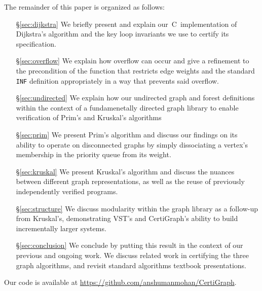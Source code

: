 The remainder of this paper is organized as follows:
\begin{itemize}
    \item[\S\ref{sec:dijkstra}] We briefly present and explain
    our~C~implementation of Dijkstra's algorithm and the key loop invariants
    we use to certify its specification.
    \item[\S\ref{sec:overflow}] We explain how overflow can occur and give a
    refinement to the precondition of the function that restricts edge weights
    and the standard \texttt{INF} definition
    appropriately in a way that prevents said overflow.
    \item[\S\ref{sec:undirected}] We explain how our undirected graph and forest definitions within the context of a fundamenetally directed graph library to enable verification of Prim's and Kruskal's algorithms
    \item[\S\ref{sec:prim}] We present Prim's algorithm and discuss our findings on its ability to operate on disconnected graphs by simply dissociating a vertex's membership in the priority queue from its weight.
    \item[\S\ref{sec:kruskal}] We present Kruskal's algorithm and discuss the nuances between different graph representations, as well as the reuse of previously independently verified programs.
    \item[\S\ref{sec:structure}] We discuss modularity within the graph library as a follow-up from Kruskal's, demonstrating VST's and CertiGraph's ability to build incrementally larger systems.
    \item[\S\ref{sec:conclusion}] We conclude by putting this result in the context of our
    previous and ongoing work. We discuss related work in certifying the three graph algorithms, and revisit standard algorithms textbook presentations.
\end{itemize} 

\noindent Our code is available at \url{https://github.com/anshumanmohan/CertiGraph}.
